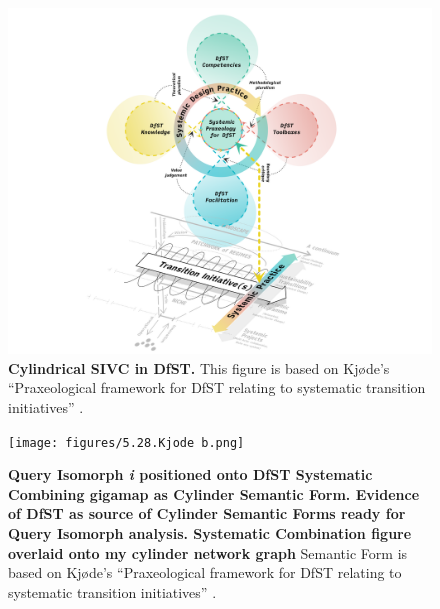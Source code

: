 \begin{figure}[h!]
    \centering
    \includegraphics[width=\textwidth]{figures/5.27.png}
    \caption[Cylindrical SIVC in DfST]{ \textbf{Cylindrical SIVC in DfST.} This figure is based on Kjøde’s “Praxeological framework for DfST relating to systematic transition initiatives” \citep[p. 144]{kjode_entanglement_2024}.
}
    \label{f5.27}
\end{figure}




\begin{figure}[h!]
    \centering
    \texttt{[image: figures/5.28.Kjode b.png]}
    \caption[Query Isomorph \textit{i} positioned onto DfST Systematic Combining gigamap as Cylinder Semantic Form]{ \textbf{Query Isomorph \textit{i} positioned onto DfST Systematic Combining gigamap as Cylinder Semantic Form. Evidence of DfST as source of Cylinder Semantic Forms ready for Query Isomorph analysis. Systematic Combination figure overlaid onto my cylinder network graph} Semantic Form is based on Kjøde’s “Praxeological framework for DfST relating to systematic transition initiatives” \citep[p. 144]{kjode_entanglement_2024}.
}
    \label{f5.28.Kjode b}
\end{figure}
\FloatBarrier  
{}




